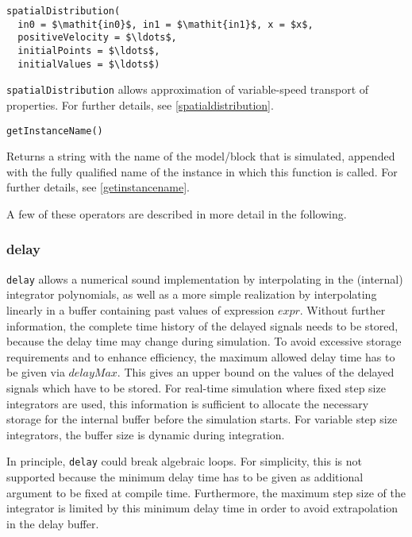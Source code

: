 \begin{operatordefinition}[spatialDistribution]
\begin{synopsis}\begin{lstlisting}
spatialDistribution(
  in0 = $\mathit{in0}$, in1 = $\mathit{in1}$, x = $x$,
  positiveVelocity = $\ldots$,
  initialPoints = $\ldots$,
  initialValues = $\ldots$)
\end{lstlisting}\end{synopsis}
\begin{semantics}
\lstinline!spatialDistribution! allows approximation of variable-speed transport of properties.
For further details, see \cref{spatialdistribution}.
\end{semantics}
\end{operatordefinition}

\begin{operatordefinition}[getInstanceName]
\begin{synopsis}\begin{lstlisting}
getInstanceName()
\end{lstlisting}\end{synopsis}
\begin{semantics}
Returns a string with the name of the model/block that is simulated, appended with the fully qualified name of the instance in which this function is called.
For further details, see \cref{getinstancename}.
\end{semantics}
\end{operatordefinition}

A few of these operators are described in more detail in the following.

\subsubsection{delay}\label{delay}

\begin{nonnormative}
\lstinline!delay! allows a numerical sound implementation by interpolating in the (internal) integrator polynomials, as well as a more simple realization by interpolating linearly in a buffer containing past values of expression $\mathit{expr}$.
Without further information, the complete time history of the delayed signals needs to be stored, because the delay time may change during simulation.
To avoid excessive storage requirements and to enhance efficiency, the maximum allowed delay time has to be given via $\mathit{delayMax}$.
This gives an upper bound on the values of the delayed signals which have to be stored.
For real-time simulation where fixed step size integrators are used, this information is sufficient to allocate the necessary storage for the internal buffer before the simulation starts.
For variable step size integrators, the buffer size is dynamic during integration.

In principle, \lstinline!delay! could break algebraic loops.
For simplicity, this is not supported because the minimum delay time has to be given as additional argument to be fixed at compile time.
Furthermore, the maximum step size of the integrator is limited by this minimum delay time in order to avoid extrapolation in the delay buffer.
\end{nonnormative}

